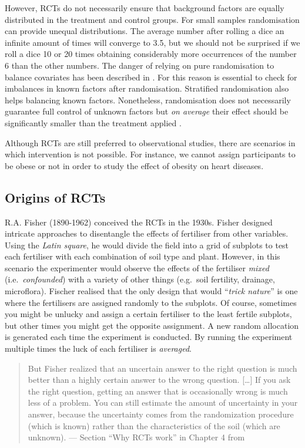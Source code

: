 \documentclass[
]{book}
\begin{document}
However, RCTs do not necessarily ensure that background factors are equally distributed in the treatment and control groups. For small samples randomisation can provide unequal distributions. The average number after rolling a dice an infinite amount of times will converge to 3.5, but we should not be surprised if we roll a dice 10 or 20 times obtaining considerably more occurrences of the number 6 than the other numbers. The danger of relying on pure randomisation to balance covariates has been described in \citep{krause2003random} \citep{morgan2012rerandomization}. For this reason is essential to check for imbalances in known factors after randomisation. Stratified randomisation also helps balancing known factors. Nonetheless, randomisation does not necessarily guarantee full control of unknown factors but \emph{on average} their effect should be significantly smaller than the treatment applied \citep{deaton2018understanding}.

Although RCTs are still preferred to observational studies, there are scenarios in which intervention is not possible. For instance, we cannot assign participants to be obese or not in order to study the effect of obesity on heart diseases.

\hypertarget{origins-of-rcts}{%
\subsection{Origins of RCTs}\label{origins-of-rcts}}

R.A. Fisher (1890-1962) conceived the RCTs in the 1930s. Fisher designed intricate approaches to disentangle the effects of fertiliser from other variables. Using the \emph{Latin square}, he would divide the field into a grid of subplots to test each fertiliser with each combination of soil type and plant. However, in this scenario the experimenter would observe the effects of the fertiliser \emph{mixed} (i.e.~\emph{confounded}) with a variety of other things (e.g.~soil fertility, drainage, microflora). Fischer realised that the only design that would ``\emph{trick nature}'' is one where the fertilisers are assigned randomly to the subplots. Of course, sometimes you might be unlucky and assign a certain fertiliser to the least fertile subplots, but other times you might get the opposite assignment. A new random allocation is generated each time the experiment is conducted. By running the experiment multiple times the luck of each fertiliser is \emph{averaged}.

\begin{quote}
But Fisher realized that an uncertain answer to the right question is much better than a highly certain answer to the wrong question. {[}\ldots{]} If you ask the right question, getting an answer that is occasionally wrong is much less of a problem. You can still estimate the amount of uncertainty in your answer, because the uncertainty comes from the randomization procedure (which is known) rather than the characteristics of the soil (which are unknown). --- Section ``Why RCTs work'' in Chapter 4 from \citep{book-of-why}
\end{quote}
\end{document}
